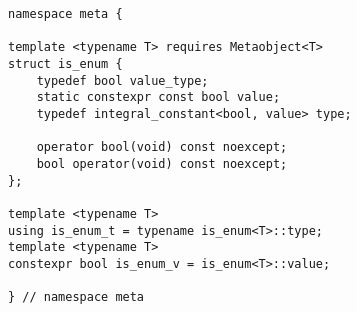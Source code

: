 
\begin{verbatim}
namespace meta {

template <typename T> requires Metaobject<T>
struct is_enum {
	typedef bool value_type;
	static constexpr const bool value;
	typedef integral_constant<bool, value> type;

	operator bool(void) const noexcept;
	bool operator(void) const noexcept;
};

template <typename T>
using is_enum_t = typename is_enum<T>::type;
template <typename T>
constexpr bool is_enum_v = is_enum<T>::value;

} // namespace meta
\end{verbatim}
